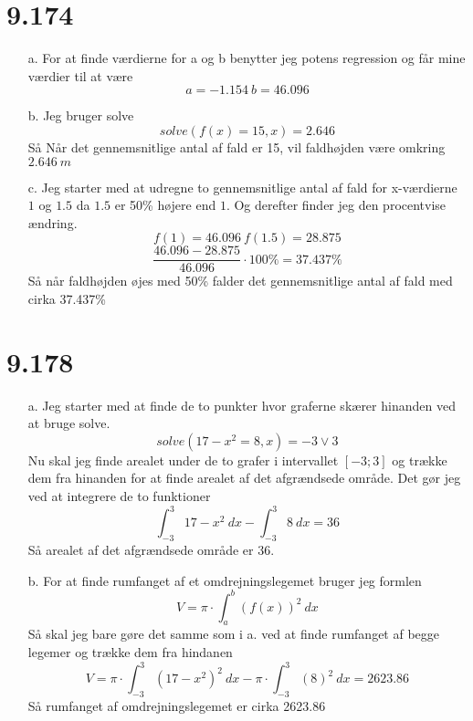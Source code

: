 \documentclass[12pt]{article}
\begin{document}
\section{9.174}
\begin{enumerate}
  \item[a.] For at finde værdierne for a og b benytter jeg potens regression og får mine værdier til at være
  $$a = -1.154 \ b = 46.096$$
  \item[b.] Jeg bruger solve
  $$solve(f(x)=15,x)=2.646$$
  Så Når det gennemsnitlige antal af fald er 15, vil faldhøjden være omkring $2.646 \ m$
  \item[c.] Jeg starter med at udregne to gennemsnitlige antal af fald for x-værdierne $1$ og $1.5$ da $1.5$ er 50\% højere end $1$.
  Og derefter finder jeg den procentvise ændring.
  $$f(1) = 46.096 \ f(1.5) = 28.875$$
  $$\frac{46.096-28.875}{46.096} \cdot 100\%=37.437\%$$
  Så når faldhøjden øjes med 50\% falder det gennemsnitlige antal af fald med cirka 37.437\%
\end{enumerate}

\section{9.178}

\begin{center}
\end{center}

\begin{enumerate}
  \item[a.] Jeg starter med at finde de to punkter hvor graferne skærer hinanden ved at bruge solve.
  $$solve(17-x^2=8, x)=-3 \vee 3$$
  Nu skal jeg finde arealet under de to grafer i intervallet $[-3;3]$ og trække dem fra hinanden for at finde arealet af det afgrændsede område.
  Det gør jeg ved at integrere de to funktioner
  $$\int_{-3}^{3}17-x^2 \ dx- \int_{-3}^{3}8 \ dx=36$$
  Så arealet af det afgrændsede område er 36.

  \item[b.] For at finde rumfanget af et omdrejningslegemet bruger jeg formlen
  $$V=\pi \cdot \int_{a}^{b}(f(x))^2 \ dx$$
  Så skal jeg bare gøre det samme som i a. ved at finde rumfanget af begge legemer og trække dem fra hindanen
  $$V=\pi \cdot \int_{-3}^{3}(17-x^2)^2 \ dx - \pi \cdot \int_{-3}^{3} (8)^2 \ dx = 2623.86$$
  Så rumfanget af omdrejningslegemet er cirka 2623.86
\end{enumerate}
\end{document}
